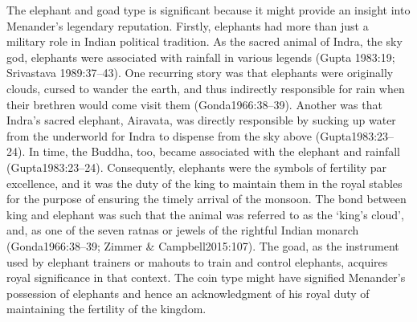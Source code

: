 \documentclass{ijsra}
\begin{document}
The elephant and goad type is significant because it might provide an insight into Menander’s legendary reputation.
Firstly, elephants had more than just a military role in Indian political tradition.
As the sacred animal of Indra, the sky god, elephants were associated with rainfall in various legends (Gupta 1983:19; Srivastava 1989:37–43).
One recurring story was that elephants were originally clouds, cursed to wander the earth, 
and thus indirectly responsible for rain when their brethren would come visit them (Gonda1966:38–39). 
Another was that Indra’s sacred elephant, Airavata, was directly responsible by sucking up water from the underworld for
Indra to dispense from the sky above (Gupta1983:23–24). 
In time, the Buddha, too, became associated with the elephant and rainfall (Gupta1983:23–24). 
Consequently, elephants were the symbols of fertility par excellence, and it was the duty of the king to maintain them in
the royal stables for the purpose of ensuring the timely arrival of the monsoon. 
The bond between king and elephant was such that the animal was referred to as the ‘king’s cloud’, and,
as one of the seven ratnas or jewels of the rightful Indian monarch (Gonda1966:38–39; Zimmer & Campbell2015:107). 
The goad, as the instrument used by elephant trainers or mahouts to train and control elephants,
acquires royal significance in that context.
The coin type might have signified Menander’s possession of elephants and hence an acknowledgment of his royal duty of maintaining
the fertility of the kingdom.
\end{document}
